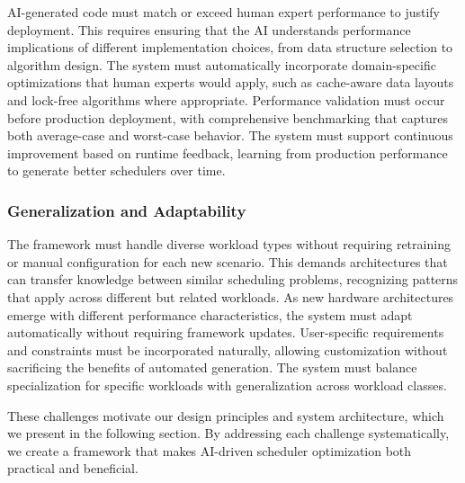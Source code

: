 AI-generated code must match or exceed human expert performance to justify deployment. This requires ensuring that the AI understands performance implications of different implementation choices, from data structure selection to algorithm design. The system must automatically incorporate domain-specific optimizations that human experts would apply, such as cache-aware data layouts and lock-free algorithms where appropriate. Performance validation must occur before production deployment, with comprehensive benchmarking that captures both average-case and worst-case behavior. The system must support continuous improvement based on runtime feedback, learning from production performance to generate better schedulers over time.

\subsubsection{Generalization and Adaptability}

The framework must handle diverse workload types without requiring retraining or manual configuration for each new scenario. This demands architectures that can transfer knowledge between similar scheduling problems, recognizing patterns that apply across different but related workloads. As new hardware architectures emerge with different performance characteristics, the system must adapt automatically without requiring framework updates. User-specific requirements and constraints must be incorporated naturally, allowing customization without sacrificing the benefits of automated generation. The system must balance specialization for specific workloads with generalization across workload classes.

These challenges motivate our design principles and system architecture, which we present in the following section. By addressing each challenge systematically, we create a framework that makes AI-driven scheduler optimization both practical and beneficial.